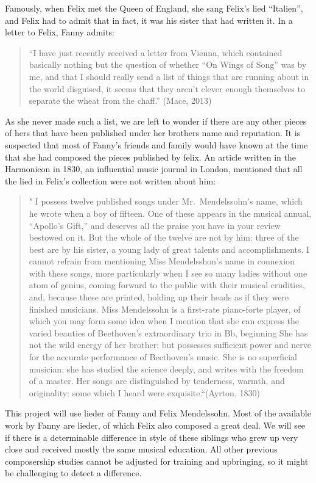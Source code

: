 \documentclass[12pt,twoside]{reedthesis}
\theoremstyle{definition}
\theoremstyle{definition}
\theoremstyle{definition}
\theoremstyle{remark}
\begin{document}
Famously, when Felix met the Queen of England, she sang Felix's lied
``Italien'', and Felix had to admit that in fact, it was his sister that
had written it. In a letter to Felix, Fanny admits:
\begin{quote}
``I have just recently received a letter from Vienna, which contained
basically nothing but the question of whether ``On Wings of Song'' was
by me, and that I should really send a list of things that are running
about in the world disguised, it seems that they aren't clever enough
themselves to separate the wheat from the chaff.'' (Mace, 2013)
\end{quote}
As she never made such a list, we are left to wonder if there are any
other pieces of hers that have been published under her brothers name
and reputation. It is suspected that most of Fanny's friends and family
would have known at the time that she had composed the pieces published
by felix. An article written in the Harmonicon in 1830, an influential
music journal in London, mentioned that all the lied in Felix's
collection were not written about him:
\begin{quote}
" I possess twelve published songs under Mr.~Mendelssohn's name, which
he wrote when a boy of fifteen. One of these appears in the musical
annual, ``Apollo's Gift,'' and deserves all the praise you have in your
review bestowed on it. But the whole of the twelve are not by him: three
of the best are by his sister, a young lady of great talents and
accomplishments. I cannot refrain from mentioning Miss Mendelsshon's
name in connexion with these songs, more particularly when I see so many
ladies without one atom of genius, coming forward to the public with
their musical crudities, and, because these are printed, holding up
their heads as if they were finished musicians. Miss Mendelssohn is a
first-rate piano-forte player, of which you may form some idea when I
mention that she can express the varied beauties of Beethoven's
extraordinary trio in Bb, beginning She has not the wild energy of her
brother; but possesses sufficient power and nerve for the accurate
performance of Beethoven's music. She is no superficial musician; she
has studied the science deeply, and writes with the freedom of a master.
Her songs are distinguished by tenderness, warmth, and originality: some
which I heard were exquisite.``(Ayrton, 1830)
\end{quote}
This project will use lieder of Fanny and Felix Mendelssohn. Most of the
available work by Fanny are lieder, of which Felix also composed a great
deal. We will see if there is a determinable difference in style of
these siblings who grew up very close and received mostly the same
musical education. All other previous composership studies cannot be
adjusted for training and upbringing, so it might be challenging to
detect a difference.
\end{document}
